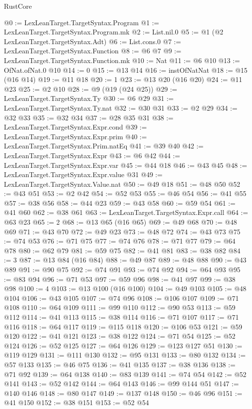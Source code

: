 \begin{lexlean}{RustCore}
\begin{coremodule}
@0 := LexLeanTarget.TargetSyntax.Program
@1 := LexLeanTarget.TargetSyntax.Program.mk
@2 := List.nil.{0}
@5 := @1 (@2 LexLeanTarget.TargetSyntax.Adt)
@6 := List.cons.{0}
@7 := LexLeanTarget.TargetSyntax.Function
@8 := @6 @7
@9 := LexLeanTarget.TargetSyntax.Function.mk
@10 := Nat
@11 := @6 @10
@13 := OfNat.ofNat.{0} @10
@14 := 0
@15 := @13 @14
@16 := instOfNatNat
@18 := @15 (@16 @14)
@19 := @11 @18
@20 := 1
@23 := @13 @20 (@16 @20)
@24 := @11 @23
@25 := @2 @10
@28 := @9 (@19 (@24 @25))
@29 := LexLeanTarget.TargetSyntax.Ty
@30 := @6 @29
@31 := LexLeanTarget.TargetSyntax.Ty.nat
@32 := @30 @31
@33 := @2 @29
@34 := @32 @33
@35 := @32 @34
@37 := @28 @35 @31
@38 := LexLeanTarget.TargetSyntax.Expr.cond
@39 := LexLeanTarget.TargetSyntax.Expr.prim
@40 := LexLeanTarget.TargetSyntax.Prim.natEq
@41 := @39 @40
@42 := LexLeanTarget.TargetSyntax.Expr
@43 := @6 @42
@44 := LexLeanTarget.TargetSyntax.Expr.var
@45 := @44 @18
@46 := @43 @45
@48 := LexLeanTarget.TargetSyntax.Expr.value @31
@49 := LexLeanTarget.TargetSyntax.Value.nat
@50 := @49 @18
@51 := @48 @50
@52 := @43 @51
@53 := @2 @42
@54 := @52 @53
@55 := @46 @54
@56 := @41 @55
@57 := @38 @56
@58 := @44 @23
@59 := @43 @58
@60 := @59 @54
@61 := @41 @60
@62 := @38 @61
@63 := LexLeanTarget.TargetSyntax.Expr.call
@64 := @63 @23
@65 := 2
@68 := @13 @65 (@16 @65)
@69 := @49 @68
@70 := @48 @69
@71 := @43 @70
@72 := @49 @23
@73 := @48 @72
@74 := @43 @73
@75 := @74 @53
@76 := @71 @75
@77 := @74 @76
@78 := @71 @77
@79 := @64 @78
@80 := @62 @79
@81 := @59 @75
@82 := @41 @81
@83 := @38 @82
@84 := 3
@87 := @13 @84 (@16 @84)
@88 := @49 @87
@89 := @48 @88
@90 := @43 @89
@91 := @90 @75
@92 := @74 @91
@93 := @74 @92
@94 := @64 @93
@95 := @83 @94
@96 := @71 @53
@97 := @59 @96
@98 := @41 @97
@99 := @38 @98
@100 := 4
@103 := @13 @100 (@16 @100)
@104 := @49 @103
@105 := @48 @104
@106 := @43 @105
@107 := @74 @96
@108 := @106 @107
@109 := @71 @108
@110 := @64 @109
@111 := @99 @110
@112 := @90 @53
@113 := @59 @112
@114 := @41 @113
@115 := @38 @114
@116 := @71 @107
@117 := @71 @116
@118 := @64 @117
@119 := @115 @118
@120 := @106 @53
@121 := @59 @120
@122 := @41 @121
@123 := @38 @122
@124 := @71 @54
@125 := @52 @124
@126 := @52 @125
@127 := @64 @126
@129 := @123 @127 @51
@130 := @119 @129
@131 := @111 @130
@132 := @95 @131
@133 := @80 @132
@134 := @57 @133
@135 := @46 @75
@136 := @41 @135
@137 := @38 @136
@138 := @71 @92
@139 := @64 @138
@140 := @83 @139
@141 := @74 @54
@142 := @52 @141
@143 := @52 @142
@144 := @64 @143
@146 := @99 @144 @51
@147 := @140 @146
@148 := @80 @147
@149 := @137 @148
@150 := @46 @96
@151 := @41 @150
@152 := @38 @151
@153 := @52 @54

\end{coremodule}
\end{lexlean}
